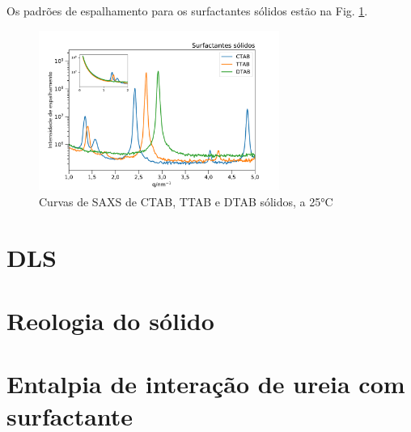 	Os padrões de espalhamento para os surfactantes sólidos estão na Fig. \ref{fig:SAXS_surf_sólido}.

	\begin{figure}[H]
		\centering
		\includegraphics[width=0.7\textwidth]{imagens/saxs/surfactante_solido}
		\caption{Curvas de SAXS de CTAB, TTAB e DTAB sólidos, a 25°C}
		\label{fig:SAXS_surf_sólido}
	\end{figure}  %
	
\section{DLS}
\section{Reologia do sólido}
\section{Entalpia de interação de ureia com surfactante}
